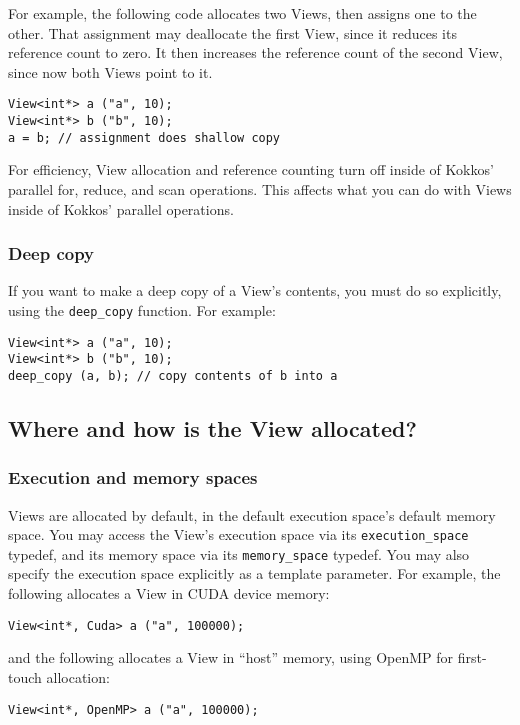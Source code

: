 For example, the following code allocates two Views, then assigns one
to the other.  That assignment may deallocate the first View, since it
reduces its reference count to zero.  It then increases the reference
count of the second View, since now both Views point to it.
\begin{lstlisting}
View<int*> a ("a", 10);
View<int*> b ("b", 10);
a = b; // assignment does shallow copy
\end{lstlisting}

For efficiency, View allocation and reference counting turn off inside
of Kokkos' parallel for, reduce, and scan operations.  This affects
what you can do with Views inside of Kokkos' parallel operations.

\subsubsection{Deep copy}

If you want to make a deep copy of a View's contents, you must do so
explicitly, using the \lstinline!deep_copy! function.  For example:
\begin{lstlisting}
View<int*> a ("a", 10);
View<int*> b ("b", 10);
deep_copy (a, b); // copy contents of b into a
\end{lstlisting}

\subsection{Where and how is the View allocated?}

\subsubsection{Execution and memory spaces}

Views are allocated by default, in the default execution space's
default memory space.  You may access the View's execution space via
its \lstinline!execution_space! typedef, and its memory space via its
\lstinline!memory_space! typedef.  You may also specify the execution space
explicitly as a template parameter.  For example, the following
allocates a View in CUDA device memory:
\begin{lstlisting}
View<int*, Cuda> a ("a", 100000);
\end{lstlisting}
and the following allocates a View in ``host'' memory, using OpenMP
for first-touch allocation:
\begin{lstlisting}
View<int*, OpenMP> a ("a", 100000);
\end{lstlisting}

